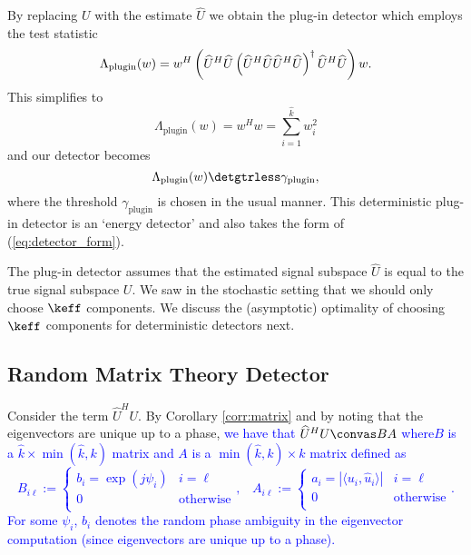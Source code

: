 By replacing $U$ with the estimate $\widehat{U}$ we obtain the plug-in detector which employs the test statistic
\begin{equation*}
\Lambda_{\text{plugin}}(w)= w^H\left(\widehat{U}^H\widehat{U}\left(\widehat{U}^H\widehat{U}\widehat{U}^H\widehat{U}\right)^{\dagger}\widehat{U}^H\widehat{U}\right)w.\\
\end{equation*}
This simplifies to
\begin{equation}\label{eq:plugin_stat_determ}
\boxed{\Lambda_{\text{plugin}}(w) = w^Hw=\sum_{i=1}^{\widehat{k}}w_i^2}
\end{equation}
and our detector becomes
\begin{equation}\label{eq:plugin_class_determ}
{\Lambda_{\text{plugin}}(w) \detgtrless \gamma_{\text{plugin}}},
\end{equation}
where the threshold $\gamma_{\text{plugin}}$ is chosen in the usual manner. This deterministic plug-in detector is an `energy detector' and also takes the form of (\ref{eq:detector_form}).

The plug-in detector assumes that the estimated signal subspace $\widehat{U}$ is equal to the true signal subspace $U$. We saw in the stochastic setting that we should only choose $\keff$ components. We discuss the (asymptotic) optimality of choosing $\keff$ components for deterministic detectors next.


\subsection{Random Matrix Theory Detector}\label{sec:optimal_determ}

Consider the term $\widehat{U}^HU$. By Corollary \ref{corr:matrix} and by noting that the eigenvectors are unique up to a phase, \textcolor{blue}{we have that $\widehat{U}^HU \convas BA$ where$B$ is a $\widehat{k}\times\min(\widehat{k},k)$ matrix and $A$ is a $\min(\widehat{k},k)\times k$ matrix defined as
\begin{equation*}
B_{i\ell}:=\begin{cases} b_i=\exp(j\psi_i) & i=\ell \\ 0 & \text{otherwise} \\ \end{cases},\,\,\,\,\,A_{i\ell}:=\begin{cases} a_i=|\langle u_i,\widehat{u}_i\rangle| & i=\ell \\ 0 & \text{otherwise} \\ \end{cases}.
\end{equation*}
For some $\psi_{i}$, $b_i$ denotes the random phase ambiguity in the eigenvector computation (since eigenvectors are unique up to a phase).}

